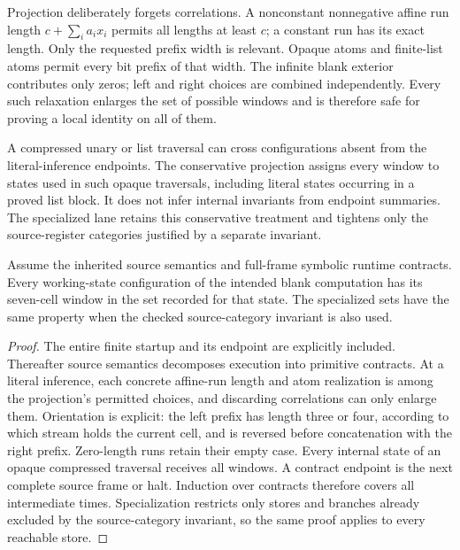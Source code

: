 \documentclass[11pt,letterpaper]{article}
\begin{document}
Projection deliberately forgets correlations. A nonconstant nonnegative
affine run length $c+\sum_i a_i x_i$ permits all lengths at least $c$; a
constant run has its exact length. Only the requested prefix width is relevant.
Opaque atoms and finite-list atoms permit every bit prefix of that width.
The infinite blank exterior contributes only zeros; left and right choices
are combined independently. Every such relaxation enlarges the set of possible
windows and is therefore safe for proving a local identity on all of them.

A compressed unary or list traversal can cross configurations absent from the
literal-inference endpoints. The conservative projection assigns every window
to states used in such opaque traversals, including literal states occurring
in a proved list block. It does not infer internal invariants from endpoint
summaries. The specialized lane retains this conservative treatment and tightens only
the source-register categories justified by a separate invariant.

\begin{lemma}
Assume the inherited source semantics and full-frame symbolic runtime
contracts. Every working-state configuration of the intended blank
computation has its seven-cell window in the set recorded for that state.
The specialized sets have the same property when the checked source-category
invariant is also used.
\end{lemma}
\begin{proof}
The entire finite startup and its endpoint are explicitly included. Thereafter
source semantics decomposes execution into primitive contracts. At a literal
inference, each concrete affine-run length and atom realization is among the
projection's permitted choices, and discarding correlations can only enlarge
them. Orientation is explicit: the left prefix has length three or four,
according to which stream holds the current cell, and is reversed before
concatenation with the right prefix. Zero-length runs retain their empty case.
Every internal state of an opaque compressed traversal receives all windows.
A contract endpoint is the next complete source frame or halt. Induction over
contracts therefore covers all intermediate times. Specialization restricts
only stores and branches already excluded by the source-category invariant,
so the same proof applies to every reachable store.
\end{proof}


\clearpage
\end{document}
